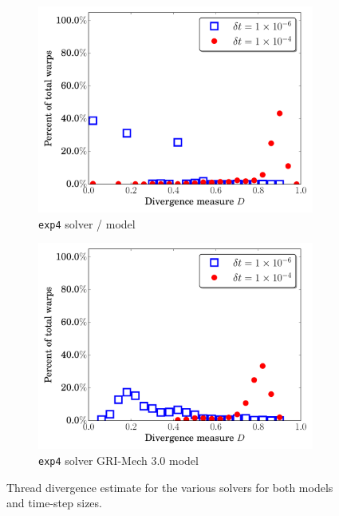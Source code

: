 \documentclass[preprint,review,11pt]{elsarticle}
\begin{document}
\begin{figure}[htbp]
\begin{subfigure}{0.49\textwidth}
      \includegraphics[width=\linewidth]{H2_exp4_div.pdf}
      \caption{\texttt{exp4} solver \slash{} model}
      \label{F:exp4_div_h2}
  \end{subfigure}
  \begin{subfigure}{0.49\textwidth}
      \includegraphics[width=\linewidth]{CH4_exp4_div.pdf}
      \caption{\texttt{exp4} solver GRI-Mech 3.0 model}
      \label{F:exp4_div_ch4}
  \end{subfigure}
  \caption{Thread divergence estimate for the various solvers for both models and time-step sizes.}
  \label{F:divergence}
\end{figure}
\end{document}
